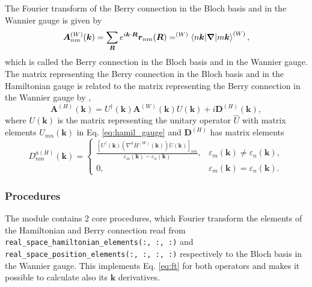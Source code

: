\documentclass[10pt,a4paper]{article}
\begin{document}
The Fourier transform of the Berry connection in the Bloch basis and in the Wannier gauge is given by~\cite{wangInitioCalculationAnomalous2006}
\begin{equation}
\bm{A}_{nm}^{(W)}(\bm{k}) = \sum_{\bm{R}} e^{i\bm{k}\cdot\bm{R}} \bm{r}_{nm}(\bm{R}) = ^{(W)}\braket{n\bm{k}|\bm{\nabla}|m\bm{k}}^{(W)},
\end{equation}
which is called the Berry connection in the Bloch basis and in the Wannier gauge. The matrix representing the Berry connection in the Bloch basis and in the Hamiltonian gauge is related to the matrix representing the Berry connection in the Wannier gauge by \cite{wangInitioCalculationAnomalous2006},
\begin{equation}
\bm{A}^{(H)}(\bm{k}) = U^{\dagger}(\bm{k})\bm{A}^{(W)}(\bm{k})U(\bm{k}) + i \bm{D}^{(H)}(\bm{k}),
\end{equation}
where $U(\bm{k})$ is the matrix representing the unitary operator $\hat{U}$ with matrix elements $U_{mn}(\bm{k})$ in Eq. \eqref{eq:hamil_gauge} and $\bm{D}^{(H)}$ has matrix elements
\begin{equation}\label{eq:d}
D^{a(H)}_{nm}(\bm{k}) = \begin{cases}
\frac{\left[U^{\dagger}(\bm{k})\left(\nabla^a H^{(W)}(\bm{k})\right)U(\bm{k})\right]_{nm}}{\varepsilon_m(\bm{k})-\varepsilon_n(\bm{k})},& \varepsilon_m(\bm{k})\neq\varepsilon_n(\bm{k}),\\
 0,& \varepsilon_m(\bm{k})=\varepsilon_n(\bm{k}).
\end{cases}
\end{equation}
\subsubsection{Procedures}
The module contains 2 core procedures, which Fourier transform the elements of the Hamiltonian and Berry connection read from \verb|real_space_hamiltonian_elements(:, :, :)| and \\ \verb|real_space_position_elements(:, :, :, :)| respectively to the Bloch basis in the Wannier gauge. This implements Eq. \eqref{eq:ft} for both operators and makes it possible to calculate also its $\bm{k}$ derivatives.
\end{document}
